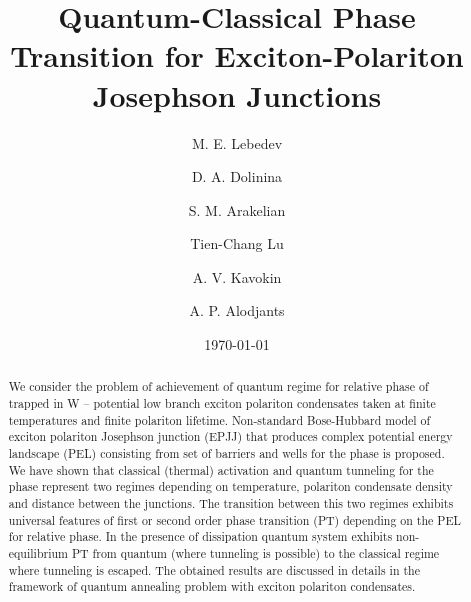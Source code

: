 \documentclass[aps, pre, preprint, groupedaddress, superscriptaddress, showkeys, showpacs] {revtex4-1}
\begin{document}
\title{Quantum-Classical Phase Transition for Exciton-Polariton Josephson Junctions}

\author{M. E. Lebedev}

\author{D. A. Dolinina}

\author{S. M. Arakelian}

\author{Tien-Chang Lu}

\author{A. V. Kavokin}

\author{A. P. Alodjants}

\date{\today}

\begin{abstract}
We consider the problem of achievement of quantum regime for  relative phase of trapped in W -- potential low branch exciton polariton condensates taken at finite temperatures and finite polariton lifetime. Non-standard Bose-Hubbard model of  exciton polariton Josephson junction (EPJJ) that produces complex potential energy landscape (PEL) consisting from set of barriers and wells for the phase is proposed. We have shown that classical (thermal) activation and quantum tunneling for the phase  represent two regimes depending on temperature, polariton condensate density and distance between the junctions. The transition between this two regimes   exhibits universal features of first or second order phase transition (PT) depending on the PEL for relative phase. In the presence of dissipation quantum system exhibits non-equilibrium PT from quantum (where tunneling is possible) to the classical regime where tunneling is escaped. The obtained results are discussed in details in the framework of quantum annealing problem with exciton polariton condensates.   
 
\end{abstract}
\end{document}
